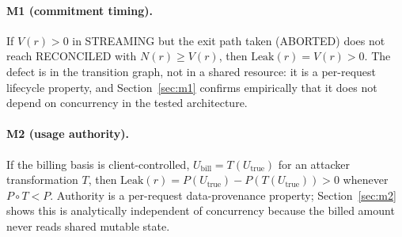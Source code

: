 \documentclass[preprint,3p,authoryear,12pt]{elsarticle}
\begin{document}
\paragraph{M1 (commitment timing).}
If $V(r) > 0$ in STREAMING but the exit path taken (ABORTED) does not reach RECONCILED
with $N(r) \ge V(r)$, then $\mathrm{Leak}(r) = V(r) > 0$. The defect is in the transition
graph, not in a shared resource: it is a per-request lifecycle property, and
Section~\ref{sec:m1} confirms empirically that it does not depend on concurrency in the
tested architecture.

\paragraph{M2 (usage authority).}
If the billing basis is client-controlled, $U_{\text{bill}} = T(U_{\text{true}})$ for an
attacker transformation $T$, then $\mathrm{Leak}(r) = P(U_{\text{true}}) -
P(T(U_{\text{true}})) > 0$ whenever $P \circ T < P$. Authority is a per-request
data-provenance property; Section~\ref{sec:m2} shows this is analytically independent of
concurrency because the billed amount never reads shared mutable state.

\begin{table}[t]
\centering
\caption{Structural distinction between the three mechanisms: what is defective, what
triggers the baseline manifestation we implemented, and what closes it. ``Trigger'' is
implementation-specific; the general condition (final column of Table~\ref{tab:practical})
is what actually matters and is not concurrency-specific for any of the three.}
\label{tab:structural}
\end{table}
\end{document}
